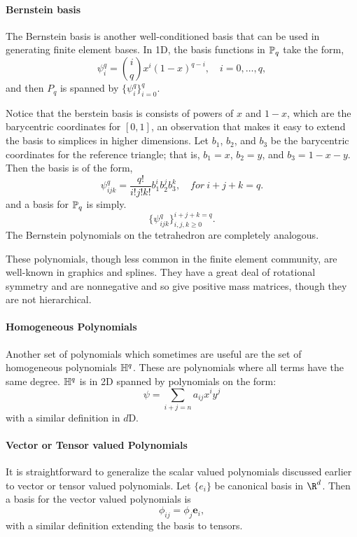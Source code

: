 \paragraph{Bernstein basis}
The Bernstein basis  is another well-conditioned basis that can be
used in generating finite element bases.
In 1D, the  basis functions in $\P_q$ take the form,
\[
\psi_i^q = \binom{i}{q} x^i (1-x)^{q-i}, \quad i=0,\ldots,q,
\]
and then \( P_q \) is spanned by \( \{ \psi_i^q \}_{i=0}^q \).

Notice that the berstein basis is consists of powers of \( x \) and \( 1-x \),  which are the
barycentric coordinates for \( [0,1] \), an observation that makes it
easy to extend the basis to simplices in higher dimensions.
Let $b_1$, $b_2$, and $b_3$ be the barycentric coordinates for
the reference triangle; that is,
$b_1=x$, $b_2=y$, and $b_3=1-x-y$. Then the basis is
of the form,
\[
\psi_{ijk}^q = \frac{q!}{i!j!k!} b_1^i b_2^j b_3^k, \quad  for \ i+j+k=q .
\]
and a basis for $\P_q$ is simply.
\[
\{ \psi_{ijk}^q \}_{i,j,k\geq 0}^{i+j+k = q} .
\]
The Bernstein polynomials on the tetrahedron are completely
analogous.

These polynomials, though less common in the finite element community,
are well-known in graphics and splines.  They have a great deal of
rotational symmetry and are nonnegative and so give positive
mass matrices, though they are not hierarchical.

\paragraph{Homogeneous Polynomials}
\label{sec:homo:pol}

Another set of polynomials which sometimes are useful are the set
of homogeneous polynomials $\H^q$. These are polynomials where all terms
have the same degree. $\H^q$ is in 2D spanned by polynomials on the
form:
\[
\psi = \sum_{i+j=n} a_{ij} x^i y^j
\]
with a similar definition in $d$D.



\paragraph{Vector or Tensor valued Polynomials}
It is straightforward to generalize the scalar valued polynomials discussed
earlier to vector or tensor valued polynomials. Let $\{e_i\}$ be canonical
basis in $\R^d$. Then a basis for the vector valued polynomials is
\[
\phi_{ij} = \phi_j \mathbf{e}_i,
\]
with a similar definition extending the basis to tensors.


